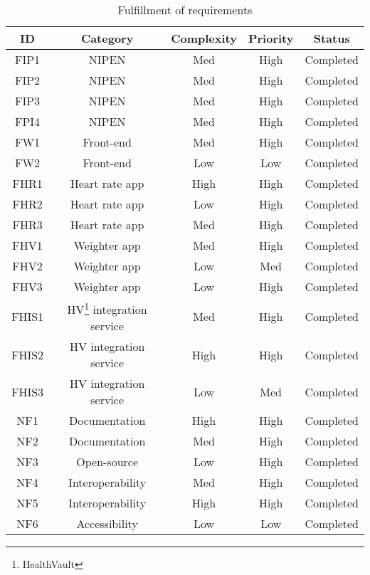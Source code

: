 \begin{table}[h]
\begin{center}
\begin{tabular}{ | c | c | c | c | c | }
  \hline
  \textbf{ID} & \textbf{Category} &\textbf{Complexity} & \textbf{Priority} & \textbf{Status}\\
  \hline\noalign{\smallskip}\noalign{\smallskip}\hline
  FIP1	& NIPEN				& Med	& High & Completed \\
  FIP2	& NIPEN				& Med	& High & Completed \\
  FIP3	& NIPEN				& Med	& High & Completed \\
  FPI4	& NIPEN				& Med	& High & Completed \\
  FW1   & Front-end			& Med	& High & Completed \\
  FW2   & Front-end			& Low	& Low  & Completed \\
  FHR1	& Heart rate app	& High	& High & Completed \\
  FHR2	& Heart rate app	& Low	& High & Completed \\
  FHR3	& Heart rate app	& Med	& High & Completed \\
  FHV1	& Weighter app		& Med	& High & Completed \\
  FHV2	& Weighter app		& Low	& Med  & Completed \\
  FHV3	& Weighter app		& Low	& High & Completed \\

  FHIS1	& HV\footnote{HealthVault} integration service	& Med   & High & Completed \\
  FHIS2	& HV integration service	& High  & High & Completed \\
  FHIS3	& HV integration service	& Low	& Med  & Completed \\

  NF1 & Documentation		& High 	& High	& Completed \\
  NF2 & Documentation		& Med 	& High	& Completed \\
  NF3 & Open-source			& Low 	& High	& Completed \\
  NF4 & Interoperability	& Med	& High	& Completed \\
  NF5 & Interoperability	& High	& High	& Completed \\
  NF6 & Accessibility		& Low	& Low	& Completed \\

  \hline
\end{tabular}
\end{center}
\caption{Fulfillment of requirements}
\label{table:fulfill-req}
\end{table}


